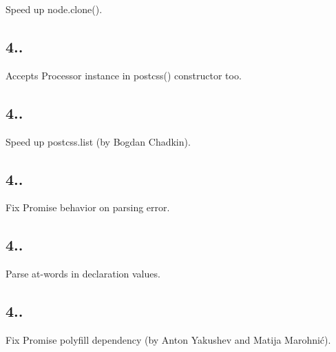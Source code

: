 \begin{DoxyItemize}
\item Speed up {\ttfamily node.\+clone()}.
\end{DoxyItemize}

\subsection*{4..}


\begin{DoxyItemize}
\item Accepts {\ttfamily Processor} instance in {\ttfamily postcss()} constructor too.
\end{DoxyItemize}

\subsection*{4..}


\begin{DoxyItemize}
\item Speed up {\ttfamily postcss.\+list} (by Bogdan Chadkin).
\end{DoxyItemize}

\subsection*{4..}


\begin{DoxyItemize}
\item Fix Promise behavior on parsing error.
\end{DoxyItemize}

\subsection*{4..}


\begin{DoxyItemize}
\item Parse at-\/words in declaration values.
\end{DoxyItemize}

\subsection*{4..}


\begin{DoxyItemize}
\item Fix Promise polyfill dependency (by Anton Yakushev and Matija Marohnić).
\end{DoxyItemize}

